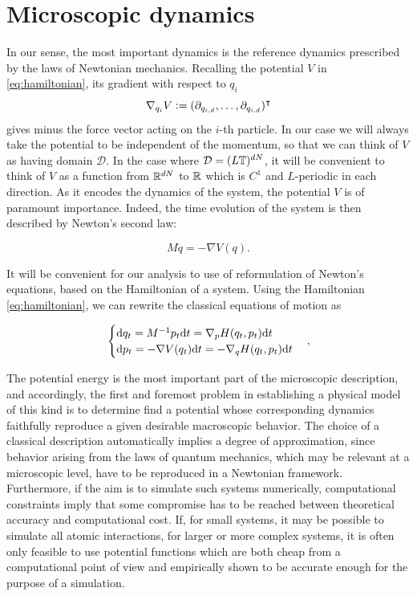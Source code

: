 \section{Microscopic dynamics}
In our sense, the most important dynamics is the reference dynamics prescribed by the laws of Newtonian mechanics.
Recalling the potential $V$ in \eqref{eq:hamiltonian}, its gradient with respect to $q_i$
$$ \nabla_{q_i} V \mathrel{\mathop:}= (\partial_{q_{i,d}},\dots , \partial_{q_{i,d}})^\intercal $$
gives minus the force vector acting on the $i$-th particle. In our case we will always take the potential to be independent of the momentum, so that we can think of $V$ as having domain $\mathcal D$. In the case where $\mathcal{D} = (L\mathbb T)^{dN}$, it will be convenient to think of $V$ as a function from $\mathbb{R}^{dN}$ to $\mathbb{R}$ which is $C^1$ and $L$-periodic in each direction.
As it encodes the dynamics of the system, the potential $V$ is of paramount importance. Indeed, the time evolution of the system is then described by Newton's second law:

\[M\ddot{q}=-\nabla V(q).\]

It will be convenient for our analysis to use of reformulation of Newton's equations, based on the Hamiltonian of a system.
Using the Hamiltonian \eqref{eq:hamiltonian}, we can rewrite the classical equations of motion as

\begin{equation}
\label{eq:hamiltonian_dynamics}
\begin{cases}
    \mathrm{d} q_t=M^{-1}p_t\mathrm{d}t=\nabla_p H(q_t,p_t)\mathrm{d}t\\
    \mathrm{d} p_t=-\nabla V(q_t)\mathrm{d}t=-\nabla_q H(q_t,p_t)\mathrm{d}t
\end{cases},
\end{equation}

The potential energy is the most important part of the microscopic description, and accordingly, the first and foremost problem in establishing a physical model of this kind is to determine find a potential whose corresponding dynamics faithfully reproduce a given desirable macroscopic behavior.
The choice of a classical description automatically implies a degree of approximation, since behavior arising from the laws of quantum mechanics, which may be relevant at a microscopic level, have to be reproduced in a Newtonian framework.
 Furthermore, if the aim is to simulate such systems numerically, computational constraints imply that some compromise has to be reached between theoretical accuracy and computational cost. 
 If, for small systems, it may be possible to simulate all atomic interactions, for larger or more complex systems, it is often only feasible to use potential functions which are both cheap from a computational point of view and empirically shown to be accurate enough for the purpose of a simulation.

